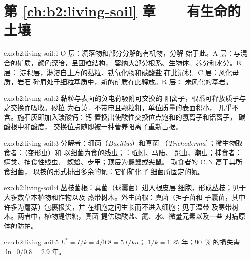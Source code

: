 \section*{第 \ref{ch:b2:living-soil} 章——有生命的土壤}

\begin{solution}{exo:b2:living-soil:1}
O 层：凋落物和部分分解的有机物，分解
始于此。A 层：与混合的矿质，颜色深暗，呈团粒结构，
容纳大部分根系、生物体、养分和水分。B 层：
淀积层，淋溶自上方的黏粒、铁氧化物和碳酸盐
在此沉积。C 层：风化母质，岩石
碎屑处于细粒基质中，新的矿质在此释放。R 层：
未风化的基岩。
\end{solution}

\begin{solution}{exo:b2:living-soil:2}
黏粒与表面的负电荷吸附可交换的
阳离子，根系可释放质子与之交换而吸收。砂粒
为石英，不带电且颗粒粗，单位质量的表面积小，
几乎不含。施石灰即加入碳酸钙：钙
置换出使酸性交换位点饱和的氢离子和铝离子，
碳酸根中和酸度，
交换位点随即被一种营养阳离子重新占据。
\end{solution}

\begin{solution}{exo:b2:living-soil:3}
分解者：细菌（\emph{Bacillus}）和真菌
（\emph{Trichoderma}）；微生物取食者：（变形虫）和
以细菌为食的线虫；：蚯蚓、马陆、
跳虫、潮虫；捕食者：螨类、捕食性线虫、
蜈蚣、步甲；顶层为鼹鼠或尖鼠。
取食者的 $\mathrm{C:N}$ 高于其所食细菌，
以铵的形式排出多余的氮：它们矿化了
细菌所固定的氮。
\end{solution}

\begin{solution}{exo:b2:living-soil:4}
丛枝菌根：真菌（球囊菌）进入根皮层
细胞，形成丛枝；见于大多数草本植物和作物以及
热带树木。外生菌根：真菌（担子菌和
子囊菌，其中许多为蘑菇）包裹根尖，并
在细胞之间生长而不进入细胞；见于温带
及寒带树木。两者中，植物提供糖，真菌
提供磷酸盐、氮、水、微量元素以及一些
对病原体的防护。
\end{solution}

\begin{solution}{exo:b2:living-soil:5}
$L^{*} = I/k = 4/0.8 = \qty{5}{t/ha}$； $1/k = 1.25$
年；\qty{90}{\%} 的损失需 $\ln 10/0.8 = 2.9$ 年。
\end{solution}

